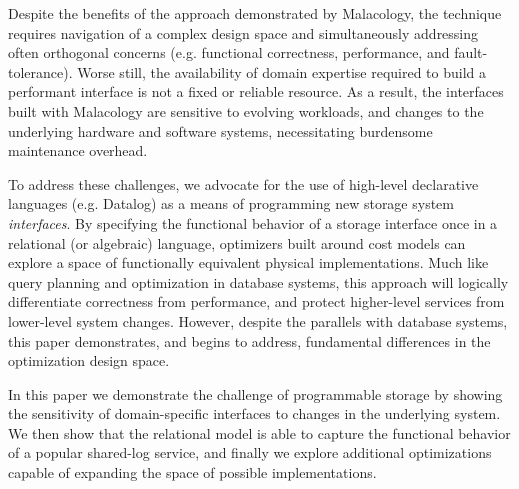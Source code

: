 Despite the benefits of the approach demonstrated by Malacology, the technique
requires navigation of
a complex design space and simultaneously addressing often orthogonal
concerns (e.g. functional correctness, performance, and fault-tolerance).
Worse still, the availability of domain expertise required to build a performant interface is not a fixed or reliable resource. 
As a result, the interfaces built with Malacology are sensitive to evolving
workloads, and changes to the underlying hardware and software systems,
necessitating burdensome maintenance overhead.

To address these challenges, we advocate for the use of high-level declarative
languages (e.g. Datalog) as a means of programming new storage system
\emph{interfaces}.  By specifying the functional behavior of a storage interface once
in a relational (or algebraic) language, optimizers built around cost models
can explore a space of
functionally equivalent physical implementations. Much like query planning and
optimization in database systems, this approach will logically differentiate
correctness from performance, and protect higher-level services from lower-level
system changes. However, despite the parallels with database systems, this
paper demonstrates, and begins to address, fundamental differences in the
optimization design space.

In this paper we demonstrate the challenge of programmable storage by showing
the sensitivity of domain-specific interfaces to changes in the underlying
system. We then show that the relational model is able to capture the
functional behavior of a popular shared-log service, and finally we explore
additional optimizations capable of expanding the space of
possible implementations.
